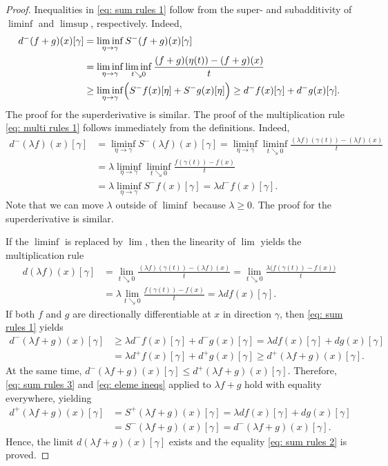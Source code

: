 \documentclass{article}
\theoremstyle{plain}\newtheorem{theorem}{Theorem}[section]
\theoremstyle{plain}\newtheorem{definition}[theorem]{Definition}
\theoremstyle{plain}\newtheorem{lemma}[theorem]{Lemma}
\theoremstyle{definition}\newtheorem{remark}[theorem]{Remark}
\theoremstyle{definition}\newtheorem{example}[theorem]{Example}
\theoremstyle{plain}\newtheorem{proposition}[theorem]{Proposition}
\theoremstyle{plain}\newtheorem{inference}[theorem]{Inference}
\theoremstyle{plain}\newtheorem{corollary}[theorem]{Corollary}
\theoremstyle{plain}\newtheorem{assumption}[theorem]{Assumption}
\begin{document}
\begin{proof}
    Inequalities in \eqref{eq: sum rules 1} follow from the super- and subadditivity of $\liminf$ and $\limsup$, respectively. Indeed,
    \begin{align*}
        d^-(f+g)(x)[\gamma]&=\liminf_{\eta\to\gamma}S^-(f+g)(x)[\gamma]\\
        &=\liminf_{\eta\to\gamma}\liminf_{t\searrow 0}\frac{(f+g)(\eta(t))-(f+g)(x)}{t}\\
        &\geq\liminf_{\eta\to\gamma}\Bigl(S^-f(x)[\eta]+S^-g(x)[\eta]\Bigr)\geq d^-f(x)[\gamma]+d^-g(x)[\gamma].
    \end{align*}
    The proof for the superderivative is similar. The proof of the multiplication rule \eqref{eq: multi rules 1} follows immediately from the definitions. Indeed,
    \begin{align*}
        d^-(\lambda f)(x)[\gamma]&=\liminf_{\eta\to\gamma}S^-(\lambda f)(x)[\gamma]=\liminf_{\eta\to\gamma}\liminf_{t\searrow 0}\frac{(\lambda f)(\gamma(t))-(\lambda f)(x)}{t}\\
        &=\lambda\liminf_{\eta\to\gamma}\liminf_{t\searrow 0}\frac{f(\gamma(t))-f(x)}{t}\\
        &=\lambda\liminf_{\eta\to\gamma}S^-f(x)[\gamma]=\lambda d^-f(x)[\gamma].
    \end{align*}
    Note that we can move $\lambda$ outside of $\liminf$ because $\lambda\geq 0$. The proof for the superderivative is similar.

    If the $\liminf$ is replaced by $\lim$, then the linearity of $\lim$ yields the multiplication rule
    \begin{align*}
        d(\lambda f)(x)[\gamma]&=\lim_{t\searrow 0}\frac{(\lambda f)(\gamma(t))-(\lambda f)(x)}{t}=\lim_{t\searrow 0}\frac{\lambda\bigl(f(\gamma(t))-f(x)\bigr)}{t}\\
        &=\lambda\lim_{t\searrow 0}\frac{f(\gamma(t))-f(x)}{t}=\lambda df(x)[\gamma].
    \end{align*}
    If both $f$ and $g$ are directionally differentiable at $x$ in direction $\gamma$, then \eqref{eq: sum rules 1} yields
    \begin{equation}\label{eq: sum rules 3}
        \begin{aligned}
            d^-(\lambda f+g)(x)[\gamma]&\geq \lambda d^-f(x)[\gamma]+d^-g(x)[\gamma]=\lambda df(x)[\gamma]+dg(x)[\gamma]\\
            &=\lambda d^+f(x)[\gamma]+d^+g(x)[\gamma]\geq d^+(\lambda f+g)(x)[\gamma].
        \end{aligned}
    \end{equation}
    At the same time, $d^-(\lambda f+g)(x)[\gamma]\leq d^+(\lambda f+g)(x)[\gamma]$. Therefore, \eqref{eq: sum rules 3} and \eqref{eq: eleme ineqs} applied to $\lambda f+g$ hold with equality everywhere, yielding
    \begin{align*}
        d^+(\lambda f+g)(x)[\gamma]&=S^+(\lambda f+g)(x)[\gamma]=\lambda df(x)[\gamma]+dg(x)[\gamma]\\
        &=S^-(\lambda f+g)(x)[\gamma]=d^-(\lambda f+g)(x)[\gamma].
    \end{align*}
    Hence, the limit $d(\lambda f+g)(x)[\gamma]$ exists and the equality \eqref{eq: sum rules 2} is proved.
\end{proof}
\end{document}
